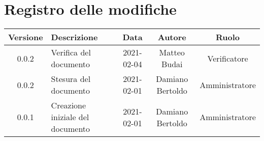 \section*{Registro delle modifiche}

\begin{center}
	\begin{longtable}{|c|p{5cm}|c|c|c|}
	\hline
	\rowcolor{lighter-grayer}
	\textbf{Versione} & \textbf{Descrizione} & \textbf{Data} & \textbf{Autore} & \textbf{Ruolo} \\
	\hline
	\endfirsthead


	\hline
	0.0.2 & Verifica del documento & 2021-02-04 & Matteo Budai & Verificatore \\
	\hline
	0.0.2 & Stesura del documento & 2021-02-01 & Damiano Bertoldo & Amministratore \\
	\hline
	0.0.1 & Creazione iniziale del documento & 2021-02-01 & Damiano Bertoldo & Amministratore \\
	\hline
	\end{longtable}
\end{center}